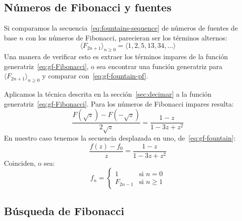 \subsection{Números de Fibonacci y fuentes}
\label{sec:Fibonacci-fuentes}

  Si comparamos la secuencia~\eqref{eq:fountains-sequence}
  de números de fuentes de base \(n\)%
  con los números de Fibonacci,
  parecieran ser los términos alternos:
  \begin{equation*}
    \langle F_{2 n + 1} \rangle_{n \ge 0}
      = \langle 1, 2, 5, 13, 34, \dotsc \rangle
  \end{equation*}
  Una manera de verificar esto es extraer los términos impares
  de la función generatriz~\eqref{eq:gf-Fibonacci},%
  o sea encontrar una función generatriz
  para \(\langle F_{2 n + 1} \rangle_{n \ge 0}\)
  y comparar con~\eqref{eq:gf-fountain-pf}.

  Aplicamos la técnica descrita en la sección~\ref{sec:decimar}
  a la función generatriz~\eqref{eq:gf-Fibonacci}.
  Para los números de Fibonacci impares resulta:
  \begin{equation*}
    \frac{F(\sqrt{z}) - F(-\sqrt{z})}{2 \sqrt{z}}
      = \frac{1 - z}{1 - 3 z + z^2}
  \end{equation*}
  En nuestro caso tenemos la secuencia desplazada en uno,
  de~\eqref{eq:gf-fountain}:
  \begin{equation*}
    \frac{f(z) - f_0}{z}
      = \frac{1 - z}{1 - 3 z + z^2}
  \end{equation*}
  Coinciden,
  o sea:
  \begin{equation}
    \label{eq:fountain-Fibonacci}
    f_n
      = \begin{cases}
	  1	      & \text{si \(n = 0\)} \\
	  F_{2 n - 1} & \text{si \(n \ge 1\)}
	\end{cases}
  \end{equation}

\subsection{Búsqueda de Fibonacci}
\label{sec:busqueda-Fibonacci}

